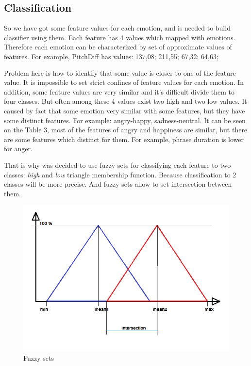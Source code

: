 \documentclass[12pt, letterpaper]{article}
\begin{document}
\subsection{Classification}
So we have got some feature values for each emotion, and is needed to build classifier using them. Each feature has 4 values which mapped with emotions. Therefore each emotion can be characterized by set of approximate values of features. For example, PitchDiff has values: 	137,08;  211,55; 67,32; 64,63; 

Problem here is how to identify that some value is closer to one of the feature value. It is impossible to set strict confines of feature
values for each emotion. In addition, some feature values are very similar and it's difficult divide them to four classes. But often among these 4 values exist two high and two low values. It caused by fact that some emotion very similar with some features, but they have some distinct features.
For example: angry-happy, sadness-neutral. It can be seen on the Table 3, most of the features of angry and happiness are similar, but there are some features which distinct for them. For example, phrase duration is lower for anger.

That is why was decided to use fuzzy sets for classifying each feature to two classes: \emph{high} and \emph{low} triangle membership function.  Because classification to 2 classes will be more precise. And fuzzy sets allow to set intersection between them.
\begin{figure}[t]
	\centering
		\includegraphics[scale=0.7]{images/fuzzy-sets.png}
	\caption{Fuzzy sets}
	\label{fig:fuzzy-sets}
\end{figure}
\end{document}
